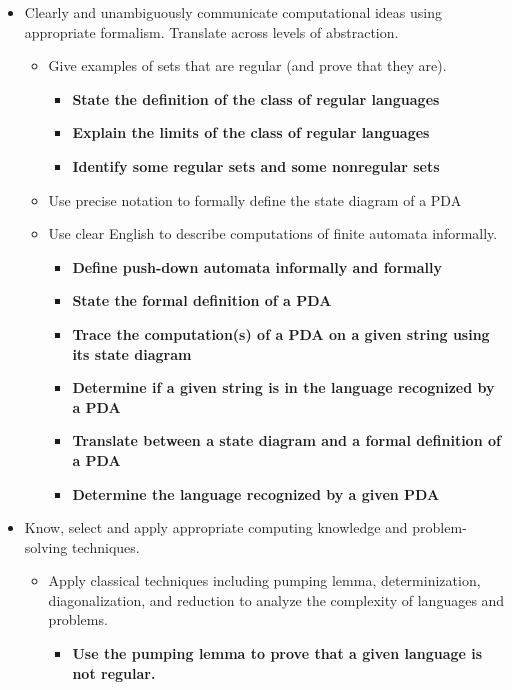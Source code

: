 \begin{itemize}
    \item Clearly and unambiguously communicate computational ideas using appropriate formalism. Translate across levels of abstraction.
    \begin{itemize}
       \item Give examples of sets that are regular (and prove that they are).
       \begin{itemize}
          \item {\bf State the definition of the class of regular languages}
          \item {\bf Explain the limits of the class of regular languages}
          \item {\bf Identify some regular sets and some nonregular sets}
       \end{itemize}
       \item Use precise notation to formally define the state diagram of a PDA
       \item Use clear English to describe computations of ﬁnite automata informally.
       \begin{itemize}
           \item {\bf Define push-down automata informally and formally}
           \item {\bf State the formal definition of a PDA}
           \item {\bf Trace the computation(s) of a PDA on a given string using its state diagram}
           \item {\bf Determine if a given string is in the language recognized by a PDA}
           \item {\bf Translate between a state diagram and a formal deﬁnition of a PDA}
           \item {\bf Determine the language recognized by a given PDA}
        \end{itemize}
    \end{itemize}

    \item Know, select and apply appropriate computing knowledge and problem-solving techniques. 
    \begin{itemize}
    \item Apply classical techniques including pumping lemma, determinization, diagonalization, and reduction to analyze the complexity of languages and problems.
    \begin{itemize}
        \item {\bf Use the pumping lemma to prove that a given language is not regular.}
    \end{itemize}
    \end{itemize}

    \end{itemize}

